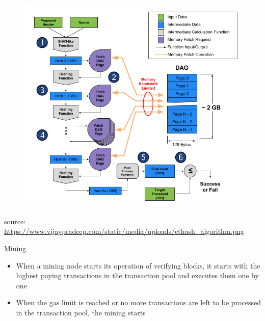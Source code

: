 \documentclass[10pt]{beamer}
\begin{document}

\begin{frame}
	\begin{figure}[]
		\centering
		\includegraphics  [scale=0.3]{Images/ethash}
	\end{figure}
	\begin{scriptsize}
		source: \href{https://www.vijaypradeep.com/blog/2017-04-28-ethereums-memory-hardness-explained/}{https://www.vijaypradeep.com/static/media/uploads/ethash\_algorithm.png}
	\end{scriptsize}
\end{frame}


\begin{frame}{Mining}
	\begin{itemize}
		\item When a mining node starts its operation of verifying blocks, it starts with the highest paying transactions in the transaction pool and executes them one by one
		\item When the gas limit is reached or no more transactions are left to be processed in the transaction pool, the mining starts
	\end{itemize}
\end{frame}
\end{document}

